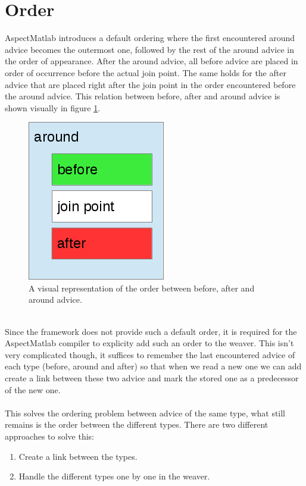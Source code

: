 \documentclass[a4paper]{report}
\begin{document}
\section{Order}
AspectMatlab introduces a default ordering where the first encountered around advice becomes the outermost one, followed by the rest of the around advice in the order of appearance. After the around advice, all before advice are placed in order of occurrence before the actual join point. The same holds for the after advice that are placed right after the join point in the order encountered before the around advice. This relation between before, after and around advice is shown visually in figure \ref{fig:AspectMatlab_Order}.\\
\begin{figure}[h!]
\center
\includegraphics[scale=0.5]{images/Languages/AspectMatlab_Order.png}
\caption{A visual representation of the order between before, after and around advice.}
\label{fig:AspectMatlab_Order}
\end{figure}
\\
Since the framework does not provide such a default order, it is required for the AspectMatlab compiler to explicity add such an order to the weaver. This isn't very complicated though, it suffices to remember the last encountered advice of each type (before, around and after) so that when we read a new one we can add create a link between these two advice and mark the stored one as a predecessor of the new one.\\
\\
This solves the ordering problem between advice of the same type, what still remains is the order between the different types. There are two different approaches to solve this:
\begin{enumerate}
\item Create a link between the types.
\item Handle the different types one by one in the weaver.
\end{enumerate}
\end{document}
